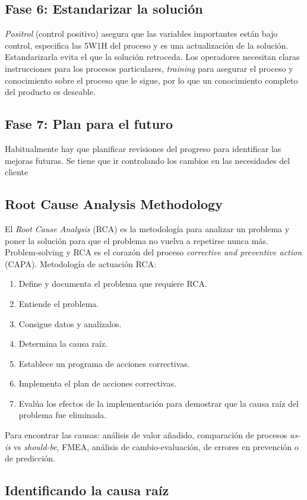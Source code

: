 \documentclass[]{article}
\begin{document}
\subsection{Fase 6: Estandarizar la solución}
\textit{Positrol} (control positivo) asegura que las variables importantes están bajo control, especifica las 5W1H del proceso y es una actualización de la solución. Estandarizarla evita el que la solución retroceda. Los operadores necesitan claras instrucciones para los procesos particulares, \textit{training} para asegurar el proceso y conocimiento sobre el proceso que le sigue, por lo que un conocimiento completo del producto es deseable.

\subsection{Fase 7: Plan para el futuro}
Habitualmente hay que planificar revisiones del progreso para identificar las mejoras futuras. Se tiene que ir controlando los cambios en las necesidades del cliente

\subsection{Root Cause Analysis Methodology}
El \textit{Root Cause Analysis} (RCA) es la metodología para analizar un problema y poner la solución para que el problema no vuelva a repetirse nunca más. Problem-solving y RCA es el corazón del proceso \textit{corrective and preventive action} (CAPA).
Metodología de actuación RCA:
\begin{enumerate}
	\item Define y documenta el problema que requiere RCA.
	\item Entiende el problema.
	\item Consigue datos y analízalos.
	\item Determina la causa raíz. 
	\item Establece un programa de acciones correctivas.
	\item Implementa el plan de acciones correctivas.
	\item Evalúa los efectos de la implementación para demostrar que la causa raíz del problema fue eliminada.
\end{enumerate}
Para encontrar las causas: análisis de valor añadido, comparación de procesos \textit{as-is} vs \textit{should-be}, FMEA, análisis de cambio-evaluación, de errores en prevención o de predicción.

\subsection{Identificando la causa raíz}
\end{document}
